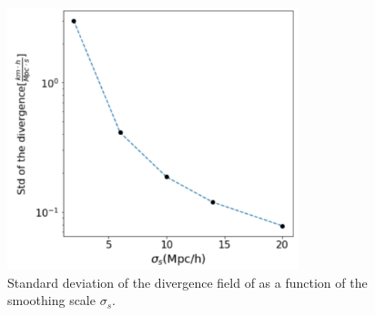\documentclass[usenatbib]{mnras}
\begin{document}
\begin{figure}
    \centering
    \includegraphics[width=240pt]{std_smooth.pdf}
    \caption{Standard deviation of the divergence field of
      as a function of the smoothing scale $\sigma_s$.}
    \label{fig:std_smooth}
\end{figure}
\end{document}
